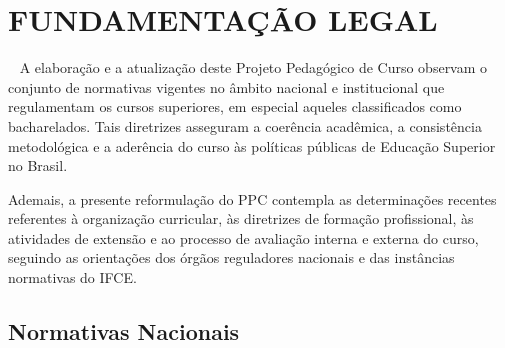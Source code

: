 
\section{\MakeUppercase{Fundamentação Legal}}
\label{FUNDAMENTAÇÃO LEGAL}
~ 
A elaboração e a atualização deste Projeto Pedagógico de Curso observam o conjunto de normativas vigentes no âmbito nacional e institucional que regulamentam os cursos superiores, em especial aqueles classificados como bacharelados. Tais diretrizes asseguram a coerência acadêmica, a consistência metodológica e a aderência do curso às políticas públicas de Educação Superior no Brasil.

Ademais, a presente reformulação do PPC contempla as determinações recentes referentes à organização curricular, às diretrizes de formação profissional, às atividades de extensão e ao processo de avaliação interna e externa do curso, seguindo as orientações dos órgãos reguladores nacionais e das instâncias normativas do IFCE.

\subsection{Normativas Nacionais}

